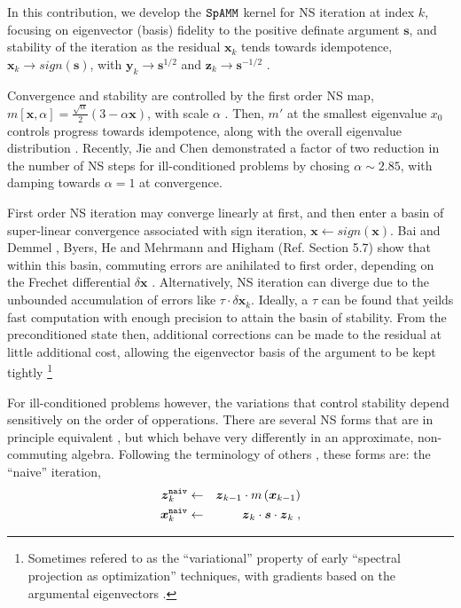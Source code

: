 \documentclass[letterpaper,twocolumn,amsmath,amsfont,amssymb,english,aps,jcp,preprintnumbers,groupaddress,nofootinbib,tightenlines]{revtex4}
\newcommand{\mat}[1]{\boldsymbol{#1}}
\begin{document}
In this contribution, we develop the $\tt SpAMM$ kernel for NS iteration at index $k$, focusing on eigenvector (basis) fidelity to the
positive definate argument $\mat{s}$, and stability of the iteration as the residual $\mat{x}_k $ tends towards 
idempotence, $\mat{x}_k \rightarrow {sign}\left( \mat{s} \right) $, with 
 $\mat{y}_k \rightarrow \mat{s}^{1/2}$  and $\mat{z}_k \rightarrow \mat{s}^{-1/2}$ \cite{higham}. 

Convergence and stability are controlled by the first order NS map, $m[\mat{x},\alpha]=\frac{\sqrt{\alpha}}{2} \left(3-\alpha \mat{x} \right)$, 
with scale $\alpha$ \cite{}. Then, $m'$ at the smallest eigenvalue $x_0$ controls progress towards idempotence, along
with the overall eigenvalue distribution \cite{}. Recently, Jie and Chen demonstrated a factor of two reduction 
in the number of NS steps for ill-conditioned problems by chosing $\alpha \sim 2.85$, with damping towards $\alpha=1$ at 
convergence.  

First order NS iteration may converge linearly at first, and then enter a basin of super-linear convergence 
associated with sign iteration,  $\mat{x} \leftarrow sign \left( \mat{x} \right)$. 
Bai and Demmel \cite{}, Byers, He and Mehrmann \cite{} and Higham (Ref.\cite{} Section 5.7)
show that within this basin, commuting errors are anihilated to first order, depending on the 
Frechet differential $\delta \mat{x}$ \cite{}. 
Alternatively, NS iteration can diverge due to the unbounded accumulation of errors 
like $ \tau \cdot \delta \mat{x}_k$. Ideally, a $\tau$ can be found 
that yeilds fast computation with enough precision to attain the basin of stability.  From the
preconditioned state then, additional corrections can be made to the residual at little additional 
cost, allowing the eigenvector basis of the argument to be kept tightly 
\footnote{Sometimes refered to as the ``variational'' property of early ``spectral projection as optimization'' 
techniques, with gradients based on the argumental eigenvectors \cite{}.}

For ill-conditioned problems however, the variations that control 
stability depend sensitively on the order of opperations. 
There are several NS forms that are in principle equivalent \cite{}, but which behave very differently in an 
approximate, non-commuting algebra.  Following the terminology of others \cite{}, these forms are: the ``naive'' iteration,
\begin{eqnarray}
\mat{z}^{\tt naiv}_{k}  &\leftarrow& \mat{z}_{k-1}  \cdot m \left( \mat{x}_{k-1} \right) \\
\mat{x}^{\tt naiv}_{k} &\leftarrow& \mat{z}_{k} \cdot \mat{s} \cdot \mat{z}_{k} \; ,
\end{eqnarray}
\end{document}
